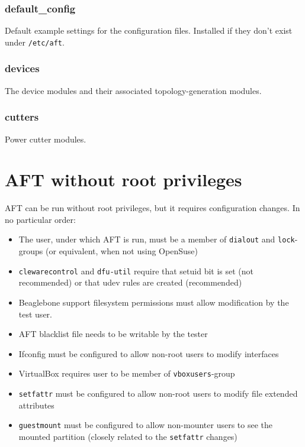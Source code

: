 \documentclass[a4paper,11pt]{article}
\newcommand{\cmd}[1]{\texttt{#1}}
\begin{document}
\subsubsection*{default\_config}
Default example settings for the configuration files. Installed if they don't exist under \cmd{/etc/aft}.

\subsubsection*{devices}
The device modules and their associated topology-generation modules.

\subsubsection*{cutters}
Power cutter modules.

\section{AFT without root privileges}
\label{app:noroot}

AFT can be run without root privileges, but it requires configuration changes. In no particular order:

\begin{itemize}
\item The user, under which AFT is run, must be a member of \cmd{dialout} and \cmd{lock}-groups (or equivalent, when not using OpenSuse)
\item \cmd{clewarecontrol} and \cmd{dfu-util} require that setuid bit is set (not recommended) or that udev rules are created (recommended)
\item Beaglebone support filesystem permissions must allow modification by the test user.
\item AFT blacklist file needs to be writable by the tester
\item Ifconfig must be configured to allow non-root users to modify interfaces
\item VirtualBox requires user to be member of \cmd{vboxusers}-group
\item \cmd{setfattr} must be configured to allow non-root users to modify file extended attributes
\item \cmd{guestmount} must be configured to allow non-mounter users to see the mounted partition (closely related to the \cmd{setfattr} changes)

\end{itemize}
\end{document}
